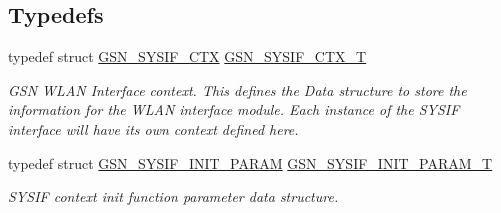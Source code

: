 \subsection*{Typedefs}
\begin{DoxyCompactItemize}
\item 
typedef struct \hyperlink{a00261}{GSN\_\-SYSIF\_\-CTX} \hyperlink{a00630_ga4109d84173a303c73e534f9bc6e04a03}{GSN\_\-SYSIF\_\-CTX\_\-T}
\begin{DoxyCompactList}\small\item\em GSN WLAN Interface context. This defines the Data structure to store the information for the WLAN interface module. Each instance of the SYSIF interface will have its own context defined here. \end{DoxyCompactList}\item 
typedef struct \hyperlink{a00262}{GSN\_\-SYSIF\_\-INIT\_\-PARAM} \hyperlink{a00630_gaefe015ce31bfc3747e1caed732284b8e}{GSN\_\-SYSIF\_\-INIT\_\-PARAM\_\-T}
\begin{DoxyCompactList}\small\item\em SYSIF context init function parameter data structure. \end{DoxyCompactList}\end{DoxyCompactItemize}
